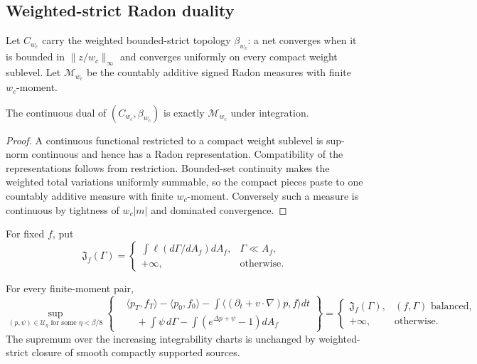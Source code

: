 \subsection{Weighted-strict Radon duality}

Let \(C_{w_c}\) carry the weighted bounded-strict topology \(\beta_{w_c}\):
a net converges when it is bounded in \(\|z/w_c\|_\infty\) and converges
uniformly on every compact weight sublevel.  Let
\(\mathcal M_{w_c}\) be the countably additive signed Radon measures with
finite \(w_c\)-moment.

\begin{lemma}
\label{lem:r5-b3-radon}
The continuous dual of \((C_{w_c},\beta_{w_c})\) is exactly
\(\mathcal M_{w_c}\) under integration.
\end{lemma}

\begin{proof}
A continuous functional restricted to a compact weight sublevel is sup-norm
continuous and hence has a Radon representation.  Compatibility of the
representations follows from restriction.  Bounded-set continuity makes the
weighted total variations uniformly summable, so the compact pieces paste to
one countably additive measure with finite \(w_c\)-moment.  Conversely such a
measure is continuous by tightness of \(w_c|m|\) and dominated convergence.
\end{proof}

For fixed \(f\), put
\[
 \mathfrak J_f(\Gamma)=
 \begin{cases}
 \displaystyle\int\ell(d\Gamma/dA_f)dA_f,&\Gamma\ll A_f,\\
 +\infty,&\text{otherwise}.
 \end{cases}
\]

\begin{theorem}
\label{thm:r5-b3-duality}
For every finite-moment pair,
\[
 \sup_{(p,\psi)\in\mathcal U_\eta\text{ for some }\eta<\beta/8}
 \left\{
 \begin{aligned}
 &\langle p_T,f_T\rangle-\langle p_0,f_0\rangle
 -\int\langle(\partial_t+v\cdot\nabla)p,f\rangle dt\\
 &\quad+\int\psi\,d\Gamma
 -\int(e^{\Delta p+\psi}-1)dA_f
 \end{aligned}
 \right\}
 =
 \begin{cases}
 \mathfrak J_f(\Gamma),&(f,\Gamma)\text{ balanced},\\
 +\infty,&\text{otherwise}.
 \end{cases}
\]
The supremum over the increasing integrability charts is unchanged by
weighted-strict closure of smooth compactly supported sources.
\end{theorem}

